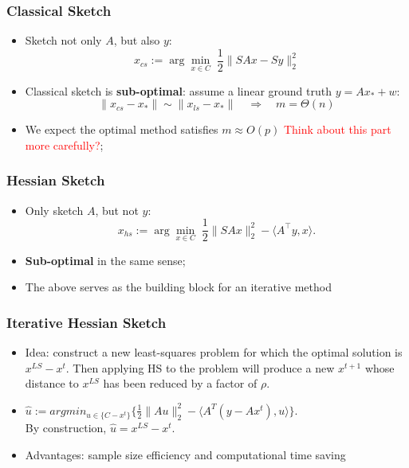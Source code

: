 \documentclass{beamer}
\begin{document}
\begin{frame}
    \frametitle{Classical Sketch}
    
    \begin{itemize}
        \item<1-> Sketch not only $A$, but also $y$:
            \begin{equation*}
                x_{cs} := \arg\min_{x \in C} \; \frac{1}{2} \|SAx-Sy\|^2_2
           \end{equation*}
       \item<2-> Classical sketch is \textbf{sub-optimal}:
           assume a linear ground truth $y = Ax_* + w$:
           \begin{equation*}
               \|x_{cs} - x_*\| \sim \|x_{ls} - x_*\|
               \quad \Rightarrow \quad
               m = \Theta(n)
           \end{equation*}
       \item<3-> We expect the optimal method satisfies $m \approx O(p)$
           \textcolor{red}{Think about this part more carefully?};
    \end{itemize}

\end{frame}

\begin{frame}
    \frametitle{Hessian Sketch}
    \begin{itemize}
        \item<1-> Only sketch $A$, but not $y$:
            \begin{equation*}
                x_{hs} := \arg\min_{x\in C} \; \frac{1}{2} \| S Ax\|^2_2 - \langle A^\top y, x \rangle.
            \end{equation*}
        \item<2-> \textbf{Sub-optimal} in the same sense;
        \item The above serves as the building block for an iterative method
    \end{itemize}
\end{frame}


\begin{frame}
\frametitle{Iterative Hessian Sketch}
\begin{itemize}
\item Idea: construct a new least-squares problem for which the optimal solution is $x^{LS} - x^t$. Then applying HS to the problem will produce a new $x^{t+1}$ whose distance to $x^{LS}$ has been reduced by a factor of $\rho$.
\item $\hat{u} := argmin_{u \in \{C-x^t\}} \{\frac{1}{2} \| Au\|^2_2 - \langle A^T( y-Ax^t), u \rangle \}.$\\
By construction, $\hat{u} = x^{LS} - x^t$.
\item Advantages: sample size efficiency and computational time saving
\end{itemize}
\end{frame}
\end{document}
